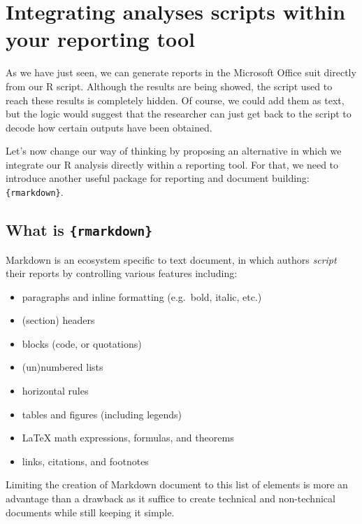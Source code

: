 \documentclass[
]{krantz}
\providecommand{\tightlist}{%
  \setlength{\itemsep}{0pt}\setlength{\parskip}{0pt}}
\begin{document}
\hypertarget{integrating-analyses-scripts-within-your-reporting-tool}{%
\section{Integrating analyses scripts within your reporting tool}\label{integrating-analyses-scripts-within-your-reporting-tool}}

As we have just seen, we can generate reports in the Microsoft Office suit directly from our R script. Although the results are being showed, the script used to reach these results is completely hidden. Of course, we could add them as text, but the logic would suggest that the researcher can just get back to the script to decode how certain outputs have been obtained.

Let's now change our way of thinking by proposing an alternative in which we integrate our R analysis directly within a reporting tool. For that, we need to introduce another useful package for reporting and document building: \texttt{\{rmarkdown\}}.

\hypertarget{what-is-rmarkdown}{%
\subsection{\texorpdfstring{What is \texttt{\{rmarkdown\}}}{What is \{rmarkdown\}}}\label{what-is-rmarkdown}}

Markdown is an ecosystem specific to text document, in which authors \emph{script} their reports by controlling various features including:

\begin{itemize}
\tightlist
\item
  paragraphs and inline formatting (e.g.~bold, italic, etc.)
\item
  (section) headers
\item
  blocks (code, or quotations)
\item
  (un)numbered lists
\item
  horizontal rules
\item
  tables and figures (including legends)
\item
  LaTeX math expressions, formulas, and theorems
\item
  links, citations, and footnotes
\end{itemize}

Limiting the creation of Markdown document to this list of elements is more an advantage than a drawback as it suffice to create technical and non-technical documents while still keeping it simple.
\end{document}
